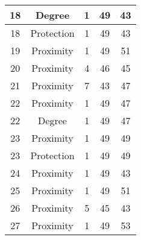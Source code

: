 \documentclass[results.tex]{subfiles}
\begin{document}
\begin{center}
\begin{tabular}{| c || c | c | c | c |}
            \hline
            18                      & Degree                       & 1                      & 49                      & 43                   \\
            \hline
            18                      & Protection                   & 1                      & 49                      & 43                   \\
            \hline
            19                      & Proximity                    & 1                      & 49                      & 51                   \\
            \hline
            20                      & Proximity                    & 4                      & 46                      & 45                   \\
            \hline
            21                      & Proximity                    & 7                      & 43                      & 47                   \\
            \hline
            22                      & Proximity                    & 1                      & 49                      & 47                   \\
            \hline
            22                      & Degree                       & 1                      & 49                      & 47                   \\
            \hline
            23                      & Proximity                    & 1                      & 49                      & 49                   \\
            \hline
            23                      & Protection                   & 1                      & 49                      & 49                   \\
            \hline
            24                      & Proximity                    & 1                      & 49                      & 43                   \\
            \hline
            25                      & Proximity                    & 1                      & 49                      & 51                   \\
            \hline
            26                      & Proximity                    & 5                      & 45                      & 43                   \\
            \hline
            27                      & Proximity                    & 1                      & 49                      & 53                   \\

\end{tabular}
\end{center}
\end{document}
